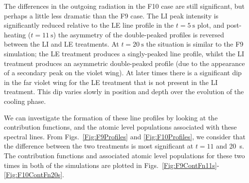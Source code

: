The differences in the outgoing radiation in the F10 case are still significant, but perhaps a little less dramatic than the F9 case.
The LI peak intensity is significantly reduced relative to the LE line profile in the $t=\SI{5}{\second}$ plot, and post-heating ($t=\SI{11}{\second}$) the asymmetry of the double-peaked profiles is reversed between the LI and LE treatments.
At $t=\SI{20}{\second}$ the situation is similar to the F9 simulation; the LE treatment produces a singly-peaked line profile, whilst the LI treatment produces an asymmetric double-peaked profile (due to the appearance of a secondary peak on the violet wing).
At later times there is a significant dip in the far violet wing for the LE treatment that is not present in the LI treatment.
This dip varies slowly in position and depth over the evolution of the cooling phase.

We can investigate the formation of these line profiles by looking at the contribution functions, and the atomic level populations associated with these spectral lines.
From Figs.~\ref{Fig:F9Profiles} and \ref{Fig:F10Profiles}, we consider that the difference between the two treatments is most significant at $t=11$ and \SI{20}{\second}.
The contribution functions and associated atomic level populations for these two times in both of the simulations are plotted in Figs.~\ref{Fig:F9ContFn11s}-\ref{Fig:F10ContFn20s}.



